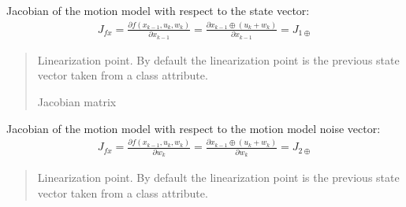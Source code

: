 \documentclass[letterpaper,10pt,english]{sphinxmanual}
\begin{document}
\begin{fulllineitems}
\begin{fulllineitems}
\label{\detokenize{GFLocalization:EKF_3DOFDifferentialDriveInputDisplacement.EKF_3DOFDifferentialDriveInputDisplacement.Jfx}}
\pysigstartsignatures
{}
\pysigstopsignatures
\sphinxAtStartPar
Jacobian of the motion model with respect to the state vector:
\begin{equation}\label{equation:GFLocalization:eq-Jfx-EKF_3DOFDifferentialDriveInputDisplacement}
\begin{split}J_{fx}=\frac{\partial f(x_{k-1},u_k,w_k)}{\partial x_{k-1}} = \frac{\partial x_{k-1} \oplus (u_k + w_k)}{\partial x_{k-1}} = J_{1\oplus}\end{split}
\end{equation}\begin{quote}\begin{description}
\sphinxAtStartPar
{} \textendash{} Linearization point. By default the linearization point is the previous state vector taken from a class attribute.

\sphinxAtStartPar
Jacobian matrix

\end{description}\end{quote}

\end{fulllineitems}


\begin{fulllineitems}
\label{\detokenize{GFLocalization:EKF_3DOFDifferentialDriveInputDisplacement.EKF_3DOFDifferentialDriveInputDisplacement.Jfw}}
\pysigstartsignatures
{}
\pysigstopsignatures
\sphinxAtStartPar
Jacobian of the motion model with respect to the motion model noise vector:
\begin{equation}\label{equation:GFLocalization:eq-Jfw-EKF_3DOFDifferentialDriveInputDisplacement}
\begin{split}J_{fx}=\frac{\partial f(x_{k-1},u_k,w_k)}{\partial w_k} = \frac{\partial x_{k-1} \oplus (u_k + w_k)}{\partial w_k} = J_{2\oplus}\end{split}
\end{equation}\begin{quote}\begin{description}
\sphinxAtStartPar
{} \textendash{} Linearization point. By default the linearization point is the previous state vector taken from a class attribute.


\end{description}
\end{quote}
\end{fulllineitems}
\end{fulllineitems}
\end{document}
